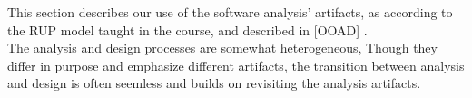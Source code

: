 \label{sec:software-analysis}
This section describes our use of the software analysis' artifacts, as according to the RUP model taught in the course, and described in [OOAD] \cite{ooad}.\\
The analysis and design processes are somewhat heterogeneous, Though they differ in purpose and emphasize different artifacts, the transition between analysis and design is often seemless and builds on revisiting the analysis artifacts.
